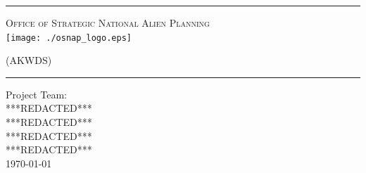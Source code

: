 \begin{titlepage}
\begin{center}

\rule{\linewidth}{0.5mm}

\textsc{\large Office of Strategic National Alien Planning}
~\\[1cm]
\texttt{[image: ./osnap\_logo.eps]}~\\[1cm]

{\Huge \linespread{2}}

\vspace{10pt}

\textsc{\Large (AKWDS)}

\rule{\linewidth}{0.5mm}

\vfill

Project Team:\\
***REDACTED***\\
***REDACTED***\\
***REDACTED***\\
***REDACTED***\\

\vfill
{\large \today}

\end{center}
\end{titlepage}